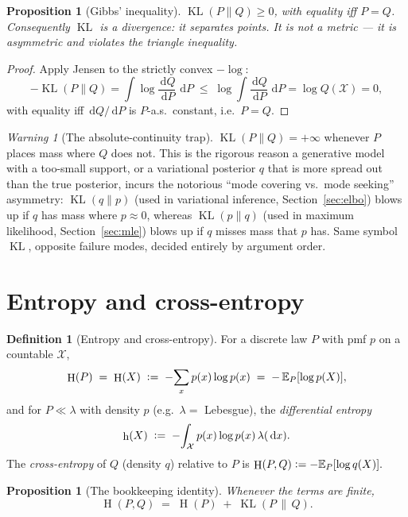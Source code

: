 \documentclass[11pt,oneside]{report}
\theoremstyle{plain}
\newtheorem{proposition}[theorem]{Proposition}
\theoremstyle{definition}
\newtheorem{definition}[theorem]{Definition}
\theoremstyle{remark}
\newtheorem{warning}[theorem]{Warning}
\newcommand{\E}{\mathbb{E}}
\newcommand{\dd}{\,\mathrm{d}}
\newcommand{\Xcal}{\mathcal{X}}
\newcommand{\defeq}{\vcentcolon=}
\DeclareMathOperator{\KL}{KL}
\DeclareMathOperator{\Ent}{H}        %
\DeclareMathOperator{\diffent}{h}    %
\numberwithin{equation}{chapter}
\begin{document}
\begin{proposition}[Gibbs' inequality]\label{prop:gibbs}
$\KL(P\|Q)\ge 0$, with equality iff $P=Q$. Consequently $\KL$ is a
\emph{divergence}: it separates points. It is \emph{not} a metric --- it is
asymmetric and violates the triangle inequality.
\end{proposition}
\begin{proof}
Apply Jensen to the strictly convex $-\log$:
\[
  -\KL(P\|Q)=\int\log\frac{\dd Q}{\dd P}\,\dd P
   \;\le\;\log\!\int\frac{\dd Q}{\dd P}\,\dd P=\log Q(\Xcal)=0,
\]
with equality iff $\dd Q/\dd P$ is $P$-a.s.\ constant, i.e.\ $P=Q$.
\end{proof}

\begin{warning}[The absolute-continuity trap]
$\KL(P\|Q)=+\infty$ whenever $P$ places mass where $Q$ does not. This is
the rigorous reason a generative model with a too-small support, or a
variational posterior $q$ that is more spread out than the true posterior,
incurs the notorious ``mode covering vs.\ mode seeking'' asymmetry:
$\KL(q\|p)$ (used in variational inference, Section~\ref{sec:elbo}) blows
up if $q$ has mass where $p\approx0$, whereas $\KL(p\|q)$ (used in maximum
likelihood, Section~\ref{sec:mle}) blows up if $q$ misses mass that $p$
has. Same symbol $\KL$, opposite failure modes, decided entirely by
argument order.
\end{warning}

\section{Entropy and cross-entropy}

\begin{definition}[Entropy and cross-entropy]\label{def:entropy}
For a discrete law $P$ with pmf $p$ on a countable $\Xcal$,
\begin{equation}
  \Ent(P)\;=\;\Ent(X)\;\defeq\;-\!\sum_{x}p(x)\log p(x)
            \;=\;-\,\E_{P}[\log p(X)],
\end{equation}
and for $P\ll\lambda$ with density $p$ (e.g.\ $\lambda=$ Lebesgue), the
\emph{differential entropy}
\begin{equation}
  \diffent(X)\;\defeq\;-\!\int_\Xcal p(x)\log p(x)\,\lambda(\dd x).
\end{equation}
The \emph{cross-entropy} of $Q$ (density $q$) relative to $P$ is
\(
  \Ent(P,Q)\defeq-\E_P[\log q(X)].
\)
\end{definition}

\begin{proposition}[The bookkeeping identity]\label{prop:ce-kl}
Whenever the terms are finite,
\begin{equation}\label{eq:ce-decomp}
  \Ent(P,Q)\;=\;\Ent(P)\;+\;\KL(P\,\|\,Q).
\end{equation}
\end{proposition}
\end{document}
